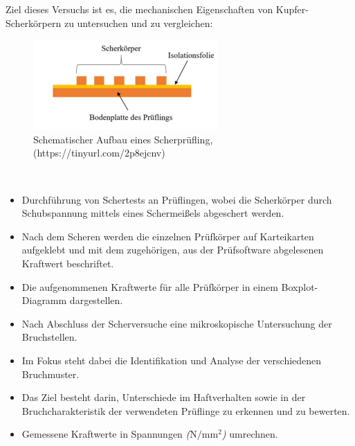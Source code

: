 Ziel dieses Versuchs ist es, die mechanischen Eigenschaften von Kupfer-Scherkörpern zu untersuchen und zu vergleichen:
\\
\vspace{0.05cm}
\begin{figure}[h]
    \centering
    \includegraphics[scale=0.95]{Bilder/schematik.png}
    \caption{ Schematischer Aufbau eines Scherprüfling, (https://tinyurl.com/2p8ejcnv)}
    \vspace{0.2cm}
    \label{Abb.2: Schematischer Aufbau eines Scherprüfling } 
\end{figure}\\

\begin{itemize}
\item Durchführung von Schertests an Prüflingen, wobei die Scherkörper durch Schubspannung mittels eines Schermeißels abgeschert werden.
\item Nach dem Scheren werden die einzelnen Prüfkörper auf Karteikarten aufgeklebt und mit dem zugehörigen, aus der Prüfsoftware abgelesenen Kraftwert beschriftet.
\item Die aufgenommenen Kraftwerte für alle Prüfkörper in einem Boxplot-Diagramm dargestellen.
\item Nach Abschluss der Scherversuche eine mikroskopische Untersuchung der Bruchstellen.
\item Im Fokus steht dabei die Identifikation und Analyse der verschiedenen Bruchmuster.
\item Das Ziel besteht darin, Unterschiede im Haftverhalten sowie in der Bruchcharakteristik der verwendeten Prüflinge zu erkennen und zu bewerten.
\item Gemessene Kraftwerte in Spannungen \textit{($\mathrm{N/mm^2}$)}  umrechnen.
\end{itemize}
